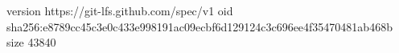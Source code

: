 version https://git-lfs.github.com/spec/v1
oid sha256:e8789cc45c3e0c433e998191ac09ecbf6d129124c3c696ee4f35470481ab468b
size 43840
